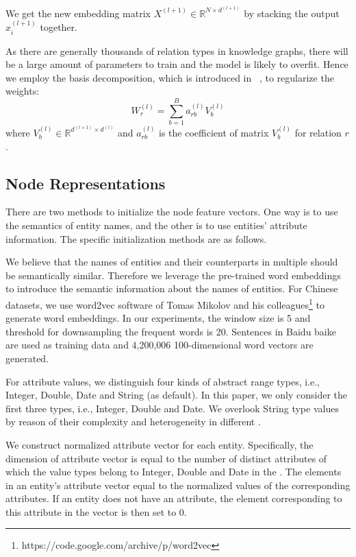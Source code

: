 	We get the new embedding matrix $X^{(l+1)} \in \mathbb{R}^{N \times d^{(l+1)}}$ by stacking the output $x_i^{(l+1)}$ together.
	
	As there are generally thousands of relation types in knowledge graphs, there will be a large amount of parameters to train and the model is likely to overfit. Hence we employ the basis decomposition, which is introduced in ~\cite{Schlichtkrull2017Modeling}, to regularize the weights:
	\begin{equation}
	W_r^{(l)}=\sum\limits_{b=1}^B a_{rb}^{(l)}V_b^{(l)}
	\end{equation}
	where $V_b^{(l)} \in \mathbb{R}^{d^{(l+1)} \times d^{(l)}}$ and $a_{rb}^{(l)}$ is the coefficient of matrix $V_b^{(l)}$ for relation $r$.
	

	\subsection{Node Representations}
	\label{subsection:Node Representations}
	There are two methods to initialize the node feature vectors.
	One way is to use the semantics of entity names, and the other is to use entities' attribute information. The specific initialization methods are as follows.
	
	\label{wordvector}
	We believe that the names of entities and their counterparts in multiple \KGs should be semantically similar. Therefore we leverage the pre-trained word embeddings to introduce the semantic information about the names of entities.
	For Chinese datasets, we use word2vec software of Tomas Mikolov and his colleagues\footnote{https://code.google.com/archive/p/word2vec} to generate word embeddings. In our experiments, the window size is 5 and threshold for downsampling the frequent words is 20. Sentences in Baidu baike are used as training data and 4,200,006 100-dimensional word vectors are generated.
	
	For attribute values, we distinguish four kinds of abstract range types, i.e., Integer, Double, Date and String (as default).
	In this paper, we only consider the first three types, i.e., Integer, Double and Date.
	We overlook String type values by reason of their complexity and heterogeneity in different \KGs.
	
	We construct normalized attribute vector for each entity.
	Specifically, the dimension of attribute vector is equal to the number of distinct attributes of which the value types belong to Integer, Double and Date in the \KG.
	The elements in an entity’s attribute vector equal to the normalized values of the corresponding attributes.
	If an entity does not have an attribute, the element corresponding to this attribute in the vector is then set to 0.
	
